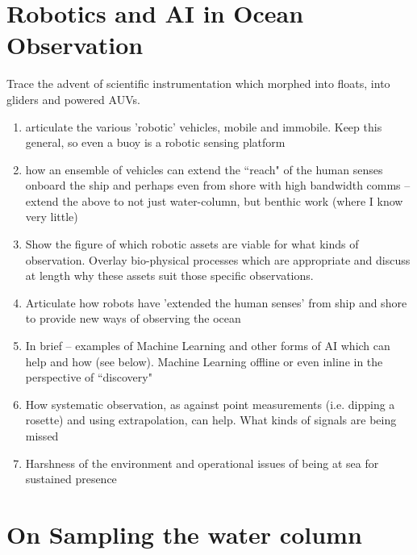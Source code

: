 \documentclass[12pt]{article}
\begin{document}
\section{Robotics and AI in Ocean Observation}

Trace the advent of scientific instrumentation which morphed into
floats, into gliders and powered AUVs.

\begin{enumerate} 

  \item articulate the various 'robotic' vehicles, mobile and
    immobile. Keep this general, so even a buoy is a robotic sensing
    platform

  \item how an ensemble of vehicles can extend the “reach" of the
    human senses onboard the ship and perhaps even from shore with
    high bandwidth comms -- extend the above to not just water-column,
    but benthic work (where I know very little)

  \item Show the figure of which robotic assets are viable for what
    kinds of observation. Overlay bio-physical processes which are
    appropriate and discuss at length why these assets suit those
    specific observations.

  \item Articulate how robots have 'extended the human senses' from
    ship and shore to provide new ways of observing the ocean

  \item In brief -- examples of Machine Learning and other forms of AI
    which can help and how (see below). Machine Learning offline or
    even inline in the perspective of “discovery"

  \item How systematic observation, as against point measurements
    (i.e. dipping a rosette) and using extrapolation, can help. What
    kinds of signals are being missed

  \item Harshness of the environment and operational issues of being
    at sea for sustained presence

\end{enumerate}

  
\section{On Sampling the water column}
\end{document}
